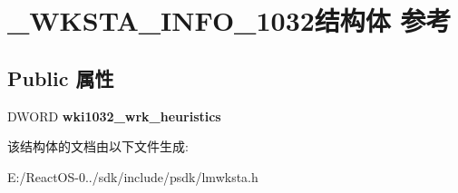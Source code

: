 \hypertarget{struct___w_k_s_t_a___i_n_f_o__1032}{}\section{\+\_\+\+W\+K\+S\+T\+A\+\_\+\+I\+N\+F\+O\+\_\+1032结构体 参考}
\label{struct___w_k_s_t_a___i_n_f_o__1032}
\subsection*{Public 属性}
\begin{DoxyCompactItemize}
\item 
\mbox{\label{struct___w_k_s_t_a___i_n_f_o__1032_a24d02ac418987b1d49bcfabab75d71ef}} 
D\+W\+O\+RD {\bfseries wki1032\+\_\+wrk\+\_\+heuristics}
\end{DoxyCompactItemize}


该结构体的文档由以下文件生成\+:\begin{DoxyCompactItemize}
\item 
E\+:/\+React\+O\+S-\/0../sdk/include/psdk/lmwksta.\+h\end{DoxyCompactItemize}
